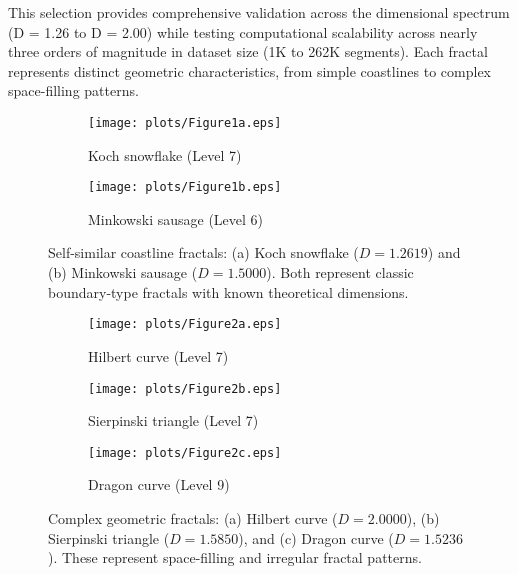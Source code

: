 \documentclass[preprint,12pt]{elsarticle}
\begin{document}
This selection provides comprehensive validation across the dimensional spectrum (D = 1.26 to D = 2.00) while testing computational scalability across nearly three orders of magnitude in dataset size (1K to 262K segments). Each fractal represents distinct geometric characteristics, from simple coastlines to complex space-filling patterns.

\begin{figure}[tbp]
\centering
\begin{subfigure}[b]{0.8\textwidth}
    \centering
    \texttt{[image: plots/Figure1a.eps]}
    \caption{Koch snowflake (Level 7)}
    \label{fig:koch_fractal}
\end{subfigure}

\vspace{0.5cm}

\begin{subfigure}[b]{0.8\textwidth}
    \centering
    \texttt{[image: plots/Figure1b.eps]}
    \caption{Minkowski sausage (Level 6)}
    \label{fig:minkowski_fractal}
\end{subfigure}
\caption{Self-similar coastline fractals: (a) Koch snowflake ($D = 1.2619$) and (b) Minkowski sausage ($D = 1.5000$). Both represent classic boundary-type fractals with known theoretical dimensions.}
\label{fig:coastline_fractals}
\end{figure}

\begin{figure}[tbp]
\centering
\begin{subfigure}[b]{0.48\textwidth}
    \centering
    \texttt{[image: plots/Figure2a.eps]}
    \caption{Hilbert curve (Level 7)}
    \label{fig:hilbert_fractal}
\end{subfigure}
\hfill
\begin{subfigure}[b]{0.48\textwidth}
    \centering
    \texttt{[image: plots/Figure2b.eps]}
    \caption{Sierpinski triangle (Level 7)}
    \label{fig:sierpinski_fractal}
\end{subfigure}

\vspace{0.4cm}

\begin{subfigure}[b]{0.480\textwidth}
    \centering
    \texttt{[image: plots/Figure2c.eps]}
    \caption{Dragon curve (Level 9)}
    \label{fig:dragon_fractal}
\end{subfigure}

\caption{Complex geometric fractals: (a) Hilbert curve ($D = 2.0000$), (b) Sierpinski triangle ($D = 1.5850$), and (c) Dragon curve ($D = 1.5236$). These represent space-filling and irregular fractal patterns.}
\label{fig:complex_fractals}
\end{figure}
\end{document}
